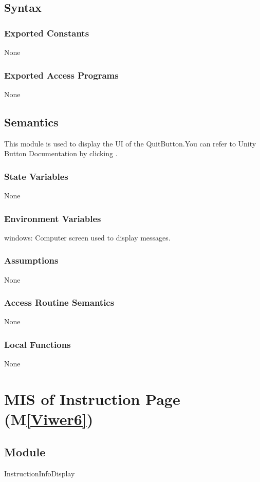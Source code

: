 \documentclass[12pt, titlepage]{article}
\newcommand{\mref}[1]{M\ref{#1}}
\begin{document}
\subsection{Syntax}
\subsubsection{Exported Constants}
None
\subsubsection{Exported Access Programs}
None

\subsection{Semantics}
This module is used to display the UI of the QuitButton.You can refer to Unity Button Documentation by clicking \bref.
\subsubsection{State Variables}
None
\subsubsection{Environment Variables}
windows: Computer screen used to display messages.
\subsubsection{Assumptions}
None
\subsubsection{Access Routine Semantics}
None
\subsubsection{Local Functions}
None

\newpage

\section{MIS of Instruction Page (\mref{Viwer6})}

\subsection{Module}
InstructionInfoDisplay
\end{document}
